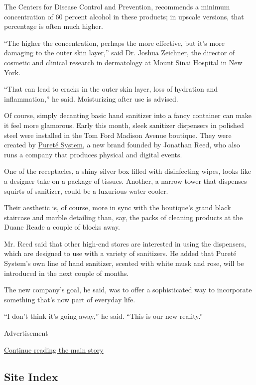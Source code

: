 The Centers for Disease Control and Prevention, recommends a minimum
concentration of 60 percent alcohol in these products; in upscale
versions, that percentage is often much higher.

``The higher the concentration, perhaps the more effective, but it's
more damaging to the outer skin layer,'' said Dr. Joshua Zeichner, the
director of cosmetic and clinical research in dermatology at Mount Sinai
Hospital in New York.

``That can lead to cracks in the outer skin layer, loss of hydration and
inflammation,'' he said. Moisturizing after use is advised.

Of course, simply decanting basic hand sanitizer into a fancy container
can make it feel more glamorous. Early this month, sleek sanitizer
dispensers in polished steel were installed in the Tom Ford Madison
Avenue boutique. They were created by
\href{https://puretesystem.com/}{Pureté System}, a new brand founded by
Jonathan Reed, who also runs a company that produces physical and
digital events.

One of the receptacles, a shiny silver box filled with disinfecting
wipes, looks like a designer take on a package of tissues. Another, a
narrow tower that dispenses squirts of sanitizer, could be a luxurious
water cooler.

Their aesthetic is, of course, more in sync with the boutique's grand
black staircase and marble detailing than, say, the packs of cleaning
products at the Duane Reade a couple of blocks away.

Mr. Reed said that other high-end stores are interested in using the
dispensers, which are designed to use with a variety of sanitizers. He
added that Pureté System's own line of hand sanitizer, scented with
white musk and rose, will be introduced in the next couple of months.

The new company's goal, he said, was to offer a sophisticated way to
incorporate something that's now part of everyday life.

``I don't think it's going away,'' he said. ``This is our new reality.''

Advertisement

\protect\hyperlink{after-bottom}{Continue reading the main story}

\hypertarget{site-index}{%
\subsection{Site Index}\label{site-index}}

